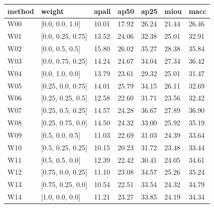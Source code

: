 \begin{tabular}{lllllll}
\toprule
method & weight & apall & ap50 & ap25 & miou & macc \\
\midrule
W00 & [0.0, 0.0, 1.0] & 10.01 & 17.92 & 26.24 & 21.44 & 26.46 \\
W01 & [0.0, 0.25, 0.75] & 13.52 & 24.06 & 32.38 & 25.01 & 32.91 \\
W02 & [0.0, 0.5, 0.5] & 15.80 & 26.02 & 35.27 & 28.38 & 35.84 \\
W03 & [0.0, 0.75, 0.25] & 14.24 & 24.67 & 34.04 & 27.34 & 36.42 \\
W04 & [0.0, 1.0, 0.0] & 13.79 & 23.61 & 29.32 & 25.01 & 31.47 \\
W05 & [0.25, 0.0, 0.75] & 14.01 & 25.79 & 34.15 & 26.11 & 32.69 \\
W06 & [0.25, 0.25, 0.5] & 12.58 & 22.60 & 31.71 & 23.56 & 32.42 \\
W07 & [0.25, 0.5, 0.25] & 14.57 & 24.28 & 36.67 & 27.89 & 36.90 \\
W08 & [0.25, 0.75, 0.0] & 14.50 & 24.32 & 33.00 & 25.92 & 35.19 \\
W09 & [0.5, 0.0, 0.5] & 11.03 & 22.69 & 31.03 & 24.39 & 33.64 \\
W10 & [0.5, 0.25, 0.25] & 10.15 & 20.23 & 31.72 & 23.48 & 33.44 \\
W11 & [0.5, 0.5, 0.0] & 12.39 & 22.42 & 30.41 & 24.05 & 34.61 \\
W12 & [0.75, 0.0, 0.25] & 11.10 & 23.08 & 34.57 & 25.26 & 35.24 \\
W13 & [0.75, 0.25, 0.0] & 10.54 & 22.51 & 33.54 & 24.32 & 34.79 \\
W14 & [1.0, 0.0, 0.0] & 11.21 & 23.27 & 33.85 & 24.19 & 34.34 \\
\bottomrule
\end{tabular}
